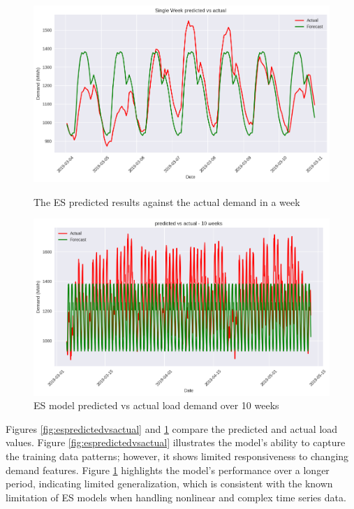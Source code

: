 \begin{figure}[h!]
	\begin{minipage}[b]{0.45\linewidth}
	\centering
	\includegraphics[width=\linewidth]{Chapters/images/results/ES_predicted_vs_actual}
	\caption{The ES predicted results against the actual demand in a week}
	\label{fig:espredictedvsactual}
\end{minipage}
\hfill
\begin{minipage}[b]{0.45\linewidth}
	\centering
	\includegraphics[width=\linewidth]{Chapters/images/results/ES_predicted_vs_actual_10weeks}
	\caption{ES model predicted vs actual load demand over 10 weeks}
	\label{fig:espredictedvsactual10weeks}
	
\end{minipage}
\end{figure}
 Figures \ref{fig:espredictedvsactual} and \ref{fig:espredictedvsactual10weeks} compare the predicted and actual load values. Figure \ref{fig:espredictedvsactual} illustrates the model’s ability to capture the training data patterns; however, it shows limited responsiveness to changing demand features. Figure \ref{fig:espredictedvsactual10weeks} highlights the model’s performance over a longer period, indicating limited generalization, which is consistent with the known limitation of ES models when handling nonlinear and complex time series data.
 
